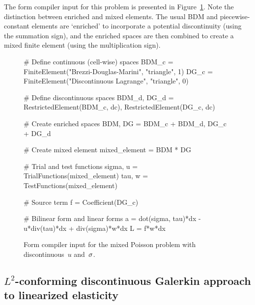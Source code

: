 The form compiler input for this problem is presented in
Figure~\ref{code:nikbakht:mixed-Poisson}.  Note the distinction between
enriched and mixed elements.  The usual BDM and piecewise-constant
elements are `enriched' to incorporate a potential discontinuity (using
the summation sign), and the enriched spaces are then combined to create
a mixed finite element (using the multiplication sign).
%
\begin{figure}
\begin{python}
# Define continuous (cell-wise) spaces
BDM_c = FiniteElement("Brezzi-Douglas-Marini", "triangle", 1)
DG_c  = FiniteElement("Discontinuous Lagrange", "triangle", 0)

# Define discontinuous spaces
BDM_d, DG_d = RestrictedElement(BDM_c, dc), RestrictedElement(DG_c, dc)

# Create enriched spaces
BDM, DG = BDM_c + BDM_d, DG_c + DG_d

# Create mixed element
mixed_element = BDM * DG

# Trial and test functions
sigma, u = TrialFunctions(mixed_element)
tau, w   = TestFunctions(mixed_element)

# Source term
f = Coefficient(DG_c)

# Bilinear form and linear forms
a = dot(sigma, tau)*dx - u*div(tau)*dx + div(sigma)*w*dx
L = f*w*dx
\end{python}
\caption{Form compiler input for the mixed Poisson problem with
discontinuous~$u$ and~$\sigma$.}
\label{code:nikbakht:mixed-Poisson}
\end{figure}

\subsection{$L^{2}$-conforming discontinuous Galerkin approach to
linearized elasticity}

